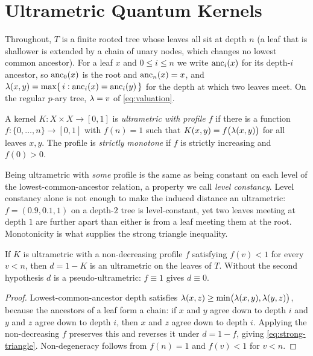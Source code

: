 \section{Ultrametric Quantum Kernels}
\label{sec:problem}

Throughout, $T$ is a finite rooted tree whose leaves all sit at depth $n$ (a leaf that
is shallower is extended by a chain of unary nodes, which changes no lowest common
ancestor). For a leaf $x$ and $0 \le i \le n$ we write $\operatorname{anc}_i(x)$ for its depth-$i$
ancestor, so $\operatorname{anc}_0(x)$ is the root and $\operatorname{anc}_n(x) = x$, and
$\lambda(x, y) = \max\{\, i : \operatorname{anc}_i(x) = \operatorname{anc}_i(y) \,\}$ for the depth at which two
leaves meet. On the regular $p$-ary tree, $\lambda = v$ of \cref{eq:valuation}.

\begin{definition}
  \label{def:ultrametric-kernel}
  A kernel $K : X \times X \to [0,1]$ is \emph{ultrametric with profile $f$} if there
  is a function $f : \{0, \dots, n\} \to [0,1]$ with $f(n) = 1$ such that
  $K(x, y) = f\bigl(\lambda(x,y)\bigr)$ for all leaves $x, y$. The profile is
  \emph{strictly monotone} if $f$ is strictly increasing and $f(0) > 0$.
\end{definition}

Being ultrametric with \emph{some} profile is the same as being constant on each level
of the lowest-common-ancestor relation, a property we call \emph{level constancy}.
Level constancy alone is not enough to make the induced distance an ultrametric:
$f = (0.9, 0.1, 1)$ on a depth-$2$ tree is level-constant, yet two leaves meeting at
depth $1$ are further apart than either is from a leaf meeting them at the root.
Monotonicity is what supplies the strong triangle inequality.

\begin{lemma}
  \label{lem:distance-is-ultrametric}
  If $K$ is ultrametric with a non-decreasing profile $f$ satisfying $f(v) < 1$ for
  every $v < n$, then $d = 1 - K$ is an ultrametric on the leaves of $T$. Without the
  second hypothesis $d$ is a pseudo-ultrametric: $f \equiv 1$ gives $d \equiv 0$.
\end{lemma}

\begin{proof}
  Lowest-common-ancestor depth satisfies
  $\lambda(x,z) \ge \min\bigl(\lambda(x,y), \lambda(y,z)\bigr)$, because the
  ancestors of a leaf form a chain: if $x$ and $y$ agree down to depth $i$ and $y$ and
  $z$ agree down to depth $i$, then $x$ and $z$ agree down to depth $i$. Applying the
  non-decreasing $f$ preserves this and reverses it under $d = 1 - f$, giving
  \cref{eq:strong-triangle}. Non-degeneracy follows from $f(n) = 1$ and $f(v) < 1$ for
  $v < n$.
\end{proof}

